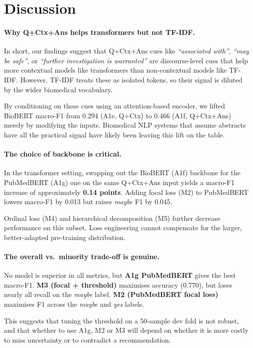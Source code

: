 \documentclass[11pt]{article}
\begin{document}
\section{Discussion}

\paragraph{Why Q+Ctx+Ans helps transformers but not TF-IDF.} In short, our findings suggest that Q+Ctx+Ans cues like \emph{``associated with''}, \emph{``may be safe''}, or \emph{``further investigation is warranted''} are discourse-level cues that help more contextual models like transformers than non-contextual models like TF-IDF. However, TF-IDF treats these as isolated tokens, so their signal is diluted by the wider biomedical vocabulary.

By conditioning on these cues using an attention-based encoder, we lifted BioBERT macro-F1 from 0.294 (A1e, Q+Ctx) to 0.466 (A1f, Q+Ctx+Ans) merely by modifying the inputs. Biomedical NLP systems that assume abstracts have all the practical signal have likely been leaving this lift on the table.

\paragraph{The choice of backbone is critical.} In the transformer setting, swapping out the BioBERT (A1f) backbone for the PubMedBERT (A1g) one on the same Q+Ctx+Ans input yields a macro-F1 increase of approximately \textbf{0.14 points}. Adding focal loss (M2) to PubMedBERT lowers macro-F1 by 0.013 but raises \textit{maybe} F1 by 0.045.

Ordinal loss (M4) and hierarchical decomposition (M5) further decrease performance on this subset. Loss engineering cannot compensate for the larger, better-adapted pre-training distribution.

\paragraph{The overall vs.\ minority trade-off is genuine.} No model is superior in all metrics, but \textbf{A1g PubMedBERT} gives the best macro-F1. \textbf{M3 (focal + threshold)} maximises accuracy (0.770), but loses nearly all recall on the \textit{maybe} label. \textbf{M2 (PubMedBERT focal loss)} maximises F1 across the \textit{maybe} and \textit{yes} labels.

This suggests that tuning the threshold on a 50-sample dev fold is not robust, and that whether to use A1g, M2 or M3 will depend on whether it is more costly to miss uncertainty or to contradict a recommendation.
\end{document}
